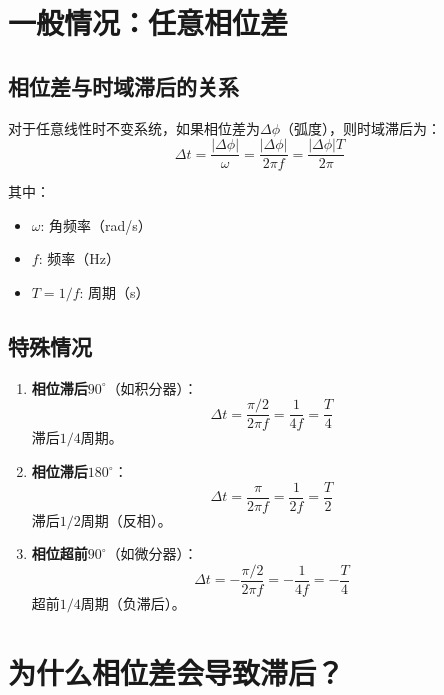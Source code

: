 \documentclass[12pt,a4paper]{article}
\begin{document}
\section{一般情况：任意相位差}

\subsection{相位差与时域滞后的关系}

对于任意线性时不变系统，如果相位差为$\Delta \phi$（弧度），则时域滞后为：
\begin{equation}
\Delta t = \frac{|\Delta \phi|}{\omega} = \frac{|\Delta \phi|}{2\pi f} = \frac{|\Delta \phi| T}{2\pi}
\end{equation}

其中：
\begin{itemize}
\item $\omega$: 角频率（rad/s）
\item $f$: 频率（Hz）
\item $T = 1/f$: 周期（s）
\end{itemize}

\subsection{特殊情况}

\begin{enumerate}
\item \textbf{相位滞后$90^\circ$}（如积分器）：
\begin{equation}
\Delta t = \frac{\pi/2}{2\pi f} = \frac{1}{4f} = \frac{T}{4}
\end{equation}
滞后$1/4$周期。

\item \textbf{相位滞后$180^\circ$}：
\begin{equation}
\Delta t = \frac{\pi}{2\pi f} = \frac{1}{2f} = \frac{T}{2}
\end{equation}
滞后$1/2$周期（反相）。

\item \textbf{相位超前$90^\circ$}（如微分器）：
\begin{equation}
\Delta t = -\frac{\pi/2}{2\pi f} = -\frac{1}{4f} = -\frac{T}{4}
\end{equation}
超前$1/4$周期（负滞后）。
\end{enumerate}

\section{为什么相位差会导致滞后？}
\end{document}
